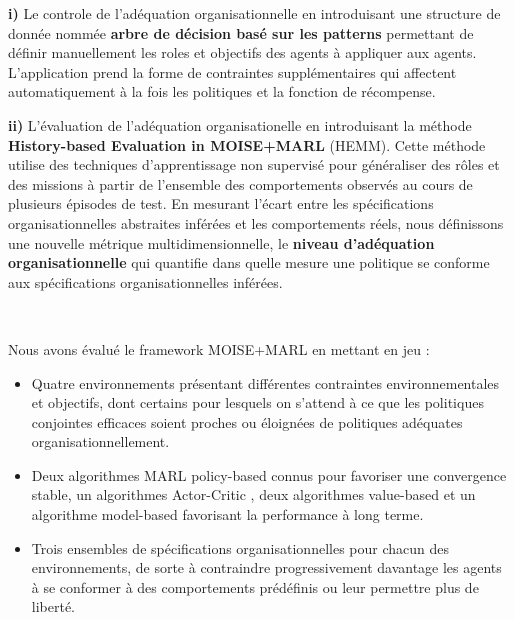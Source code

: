 \documentclass[sigconf,anonymous]{aamas}
\begin{document}
\quad \textbf{i)} Le controle de l'adéquation organisationnelle en introduisant une structure de donnée nommée \textbf{arbre de décision basé sur les patterns} permettant de définir manuellement les roles et objectifs des agents à appliquer aux agents. L'application prend la forme de contraintes supplémentaires qui affectent automatiquement à la fois les politiques et la fonction de récompense.

\quad \textbf{ii)} L'évaluation de l'adéquation organisationelle en introduisant la méthode \textbf{History-based Evaluation in MOISE+MARL} (HEMM). Cette méthode utilise des techniques d'apprentissage non supervisé pour généraliser des rôles et des missions à partir de l'ensemble des comportements observés au cours de plusieurs épisodes de test. En mesurant l'écart entre les spécifications organisationnelles abstraites inférées et les comportements réels, nous définissons une nouvelle métrique multidimensionnelle, le \textbf{niveau d'adéquation organisationnelle} qui quantifie dans quelle mesure une politique se conforme aux spécifications organisationnelles inférées.

\


\noindent Nous avons évalué le framework MOISE+MARL en mettant en jeu :
\begin{itemize}
  \item Quatre environnements présentant différentes contraintes environnementales et objectifs, dont certains pour lesquels on s'attend à ce que les politiques conjointes efficaces soient proches ou éloignées de politiques adéquates organisationnellement. %
  \item Deux algorithmes MARL policy-based
  connus pour favoriser une convergence stable, un algorithmes Actor-Critic
  , deux algorithmes value-based
  et un algorithme model-based
  favorisant la performance à long terme.
  \item Trois ensembles de spécifications organisationnelles pour chacun des environnements, de sorte à contraindre progressivement davantage les agents à se conformer à des comportements prédéfinis ou leur permettre plus de liberté.
\end{itemize}
\end{document}
